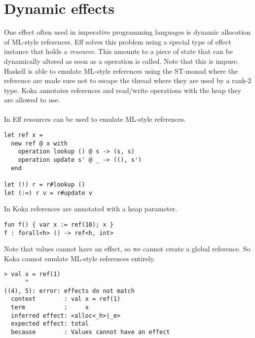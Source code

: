 \documentclass[12pt]{article}
\begin{document}
\section{Dynamic effects}
One effect often used in imperative programming languages is dynamic allocation of ML-style references. Eff solves this problem using a special type of effect instance that holds a \textit{resource}.
This amounts to a piece of state that can be dynamically altered as soon as a operation is called. Note that this is impure. Haskell is able to emulate ML-style references using the ST-monad where the reference are made sure not to escape the thread where they are used by a rank-2 type. Koka annotates references and read/write operations with the heap they are allowed to use.
\\\\
In Eff resources can be used to emulate ML-style references.
\begin{lstlisting}
let ref x =
  new ref @ x with
    operation lookup () @ s -> (s, s)
    operation update s' @ _ -> ((), s')
  end

let (!) r = r#lookup ()
let (:=) r v = r#update v
\end{lstlisting}
In Koka references are annotated with a heap parameter.
\begin{lstlisting}
fun f() { var x := ref(10); x }
f : forall<h> () -> ref<h, int>
\end{lstlisting}
Note that values cannot have an effect, so we cannot create a global reference. So Koka cannot emulate ML-style references entirely.
\begin{lstlisting}
> val x = ref(1)
      ^
((4), 5): error: effects do not match
  context        : val x = ref(1)
  term           :     x
  inferred effect: <alloc<_h>|_e>
  expected effect: total
  because        : Values cannot have an effect
\end{lstlisting}
\end{document}
